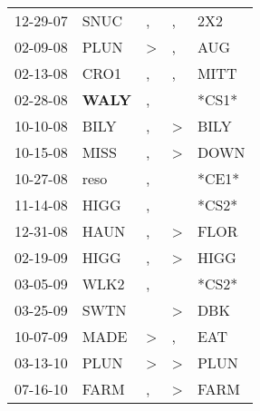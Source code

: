 \begin{supertabular}{p{0.07\textwidth}p{0.06\textwidth}p{0.02\textwidth}p{0.02\textwidth}p{0.06\textwidth}}
 12-29-07\textsuperscript{} &           SNUC\textsuperscript{} &                , &             , &   2X2\textsuperscript{} \\
 02-09-08\textsuperscript{} &           PLUN\textsuperscript{} &     \textgreater &             , &   AUG\textsuperscript{} \\
 02-13-08\textsuperscript{} &           CRO1\textsuperscript{} &                , &             , &  MITT\textsuperscript{} \\
 02-28-08\textsuperscript{} &  \textbf{WALY\textsuperscript{}} &                , &               &                   *CS1* \\
 10-10-08\textsuperscript{} &           BILY\textsuperscript{} &                , &  \textgreater &  BILY\textsuperscript{} \\
 10-15-08\textsuperscript{} &           MISS\textsuperscript{} &                , &  \textgreater &  DOWN\textsuperscript{} \\
 10-27-08\textsuperscript{} &           reso\textsuperscript{} &                , &               &                   *CE1* \\
 11-14-08\textsuperscript{} &           HIGG\textsuperscript{} &                , &               &                   *CS2* \\
 12-31-08\textsuperscript{} &           HAUN\textsuperscript{} &                , &  \textgreater &  FLOR\textsuperscript{} \\
 02-19-09\textsuperscript{} &           HIGG\textsuperscript{} &                , &  \textgreater &  HIGG\textsuperscript{} \\
 03-05-09\textsuperscript{} &           WLK2\textsuperscript{} &                , &               &                   *CS2* \\
 03-25-09\textsuperscript{} &           SWTN\textsuperscript{} &                  &  \textgreater &   DBK\textsuperscript{} \\
 10-07-09\textsuperscript{} &           MADE\textsuperscript{} &     \textgreater &             , &   EAT\textsuperscript{} \\
 03-13-10\textsuperscript{} &           PLUN\textsuperscript{} &     \textgreater &  \textgreater &  PLUN\textsuperscript{} \\
 07-16-10\textsuperscript{} &           FARM\textsuperscript{} &                , &  \textgreater &  FARM\textsuperscript{} \\

\end{supertabular}
